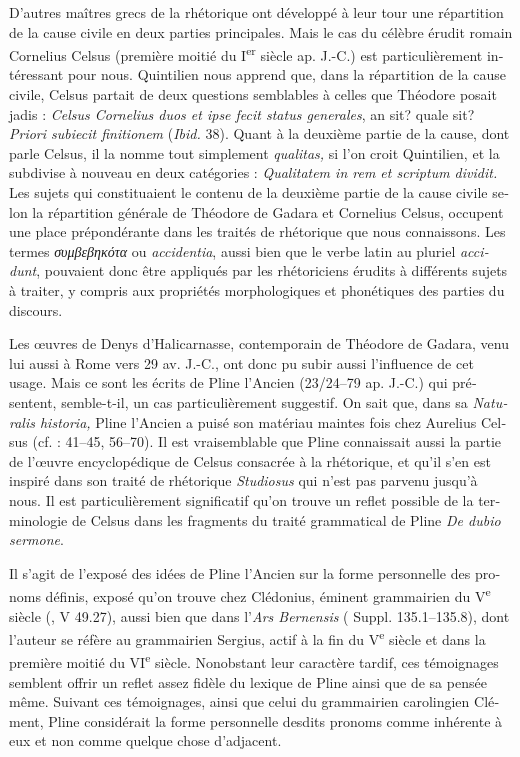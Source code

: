 \documentclass[output=paper]{langsci/langscibook}
\begin{document}
\begin{otherlanguage}{french}
D’autres maîtres grecs de la rhétorique ont développé à leur tour une répartition de la cause civile en deux parties principales. Mais le cas du célèbre érudit romain Cornelius Celsus (première moitié du I\textsuperscript{er} siècle ap. J.-C.) est particulièrement intéressant pour nous. Quintilien nous apprend que, dans la répartition de la cause civile, Celsus partait de deux questions semblables à celles que Théodore posait jadis : \textit{Celsus Cornelius duos et ipse fecit status generales}, an sit? quale sit? \textit{Priori subiecit finitionem} (\textit{Ibid.} 38). Quant à la deuxième partie de la cause, dont parle Celsus, il la nomme tout simplement \textit{qualitas,} si l’on croit Quintilien, et la subdivise à nouveau en deux catégories : \textit{Qualitatem in rem et scriptum dividit.} Les sujets qui constituaient le contenu de la deuxième partie de la cause civile selon la répartition générale de Théodore de Gadara et Cornelius Celsus, occupent une place prépondérante dans les traités de rhétorique que nous connaissons. Les termes \textit{συμβεβηκότα} ou \textit{accidentia}, aussi bien que le verbe latin au pluriel \textit{accidunt}, pouvaient donc être appliqués par les rhétoriciens érudits à différents sujets à traiter, y compris aux propriétés morphologiques et phonétiques des parties du discours.

Les œuvres de Denys d’Halicarnasse, contemporain de Théodore de Gadara, venu lui aussi à Rome vers 29 av. J.-C., ont donc pu subir aussi l’influence de cet usage. Mais ce sont les écrits de Pline l’Ancien (23/24–79 ap. J.-C.) qui présentent, semble-t-il, un cas particulièrement suggestif. On sait que, dans sa \textit{Naturalis historia,} Pline l’Ancien a puisé son matériau maintes fois chez Aurelius Celsus (cf. \citealt{munzer_beitrage_1897}: 41–45, 56–70). Il est vraisemblable que Pline connaissait aussi la partie de l’œuvre encyclopédique de Celsus consacrée à la rhétorique, et qu’il s’en est inspiré dans son traité de rhétorique \textit{Studiosus} qui n’est pas parvenu jusqu’à nous. Il est particulièrement significatif qu’on trouve un reflet possible de la terminologie de Celsus dans les fragments du traité grammatical de Pline \textit{De dubio sermone}.

Il s’agit de l’exposé des idées de Pline l’Ancien sur la forme personnelle des pronoms définis, exposé qu’on trouve chez Clédonius, éminent grammairien du V\textsuperscript{e} siècle (, V 49.27), aussi bien que dans l’\textit{Ars Bernensis} ( Suppl. 135.1--135.8), dont l’auteur se réfère au grammairien Sergius, actif à la fin du V\textsuperscript{e} siècle et dans la première moitié du VI\textsuperscript{e} siècle. Nonobstant leur caractère tardif, ces témoignages semblent offrir un reflet assez fidèle du lexique de Pline ainsi que de sa pensée même. Suivant ces témoignages, ainsi que celui du grammairien carolingien Clément, Pline considérait la forme personnelle desdits pronoms comme inhérente à eux et non comme quelque chose d’adjacent.


\end{otherlanguage}
\end{document}
